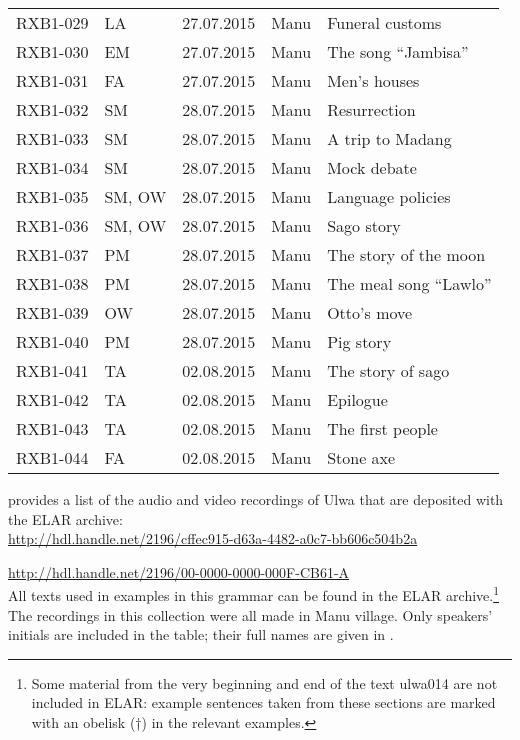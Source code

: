 \begin{xltabular}{\textwidth}{llllQ}
RXB1-029 & LA & 27.07.2015 & Manu & Funeral customs\\
RXB1-030 & EM & 27.07.2015 & Manu & The song “Jambisa”\\
RXB1-031 & FA & 27.07.2015 & Manu & Men’s houses\\
RXB1-032 & SM & 28.07.2015 & Manu & Resurrection\\
RXB1-033 & SM & 28.07.2015 & Manu & A trip to Madang\\
RXB1-034 & SM & 28.07.2015 & Manu & Mock debate\\
RXB1-035 & SM, OW & 28.07.2015 & Manu & Language policies\\
RXB1-036 & SM, OW & 28.07.2015 & Manu & Sago story\\
RXB1-037 & PM & 28.07.2015 & Manu & The story of the moon\\
RXB1-038 & PM & 28.07.2015 & Manu & The meal song “Lawlo”\\
RXB1-039 & OW & 28.07.2015 & Manu & Otto’s move\\
RXB1-040 & PM & 28.07.2015 & Manu & Pig story\\
RXB1-041 & TA & 02.08.2015 & Manu & The story of sago\\
RXB1-042 & TA & 02.08.2015 & Manu & Epilogue\\
RXB1-043 & TA & 02.08.2015 & Manu & The first people\\
RXB1-044 & FA & 02.08.2015 & Manu & Stone axe\\
\end{xltabular}


 provides a list of the audio and video recordings of Ulwa that are deposited with the ELAR archive:\\

\url{http://hdl.handle.net/2196/cffec915-d63a-4482-a0c7-bb606c504b2a}

\url{http://hdl.handle.net/2196/00-0000-0000-000F-CB61-A}\\

All texts used in examples in this grammar can be found in the ELAR archive.\footnote{Some material from the very beginning and end of the text ulwa014 are not included in ELAR: example sentences taken from these sections are marked with an obelisk (†) in the relevant examples.} The recordings in this collection were all made in Manu village. Only speakers’ initials are included in the table; their full names are given in .



